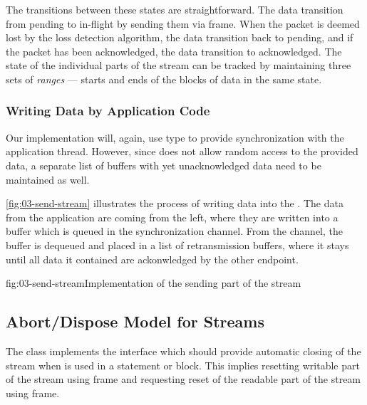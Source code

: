 The transitions between these states are straightforward. The data transition from pending to
in-flight by sending them via \STREAM{} frame. When the packet is deemed lost by the loss detection
algorithm, the data transition back to pending, and if the packet has been acknowledged, the data
transition to acknowledged. The state of the individual parts of the stream can be tracked by
maintaining three sets of \textit{ranges} --- starts and ends of the blocks of data in the same state.

\subsubsection{Writing Data by Application Code}

Our implementation will, again, use  type to provide synchronization with the
application thread. However, since  does not allow random access to the provided
data, a separate list of buffers with yet unacknowledged data need to be maintained as well.

\autoref{fig:03-send-stream} illustrates the process of writing data into the \SendStream{}. The
data from the application are coming from the left, where they are written into a buffer which is
queued in the synchronization channel. From the channel, the buffer is dequeued and placed in a list
of retransmission buffers, where it stays until all data it contained are ackonwledged by the other
endpoint.


\begin{myFigure}{fig:03-send-stream}{Implementation of the sending part of the stream}

  \resizebox{\linewidth}{!}{}

\end{myFigure}


\subsection{Abort/Dispose Model for Streams}

The \QuicStream{} class implements the  interface which should provide
automatic closing of the stream when \QuicStream{} is used in a  statement or
 block. This implies resetting writable part of the stream using \RESETSTREAM{} frame
and requesting reset of the readable part of the stream using \STOPSENDING{} frame.

